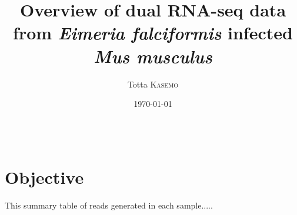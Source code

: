 \documentclass{article}
\title{Overview of dual RNA-seq data from \textit{Eimeria falciformis} infected \textit{Mus musculus}} %
\author{Totta \textsc{Kasemo}} %
\date{\today} %
\begin{document}
\maketitle %

\begin{center}
\begin{tabular}{l r}
\end{tabular}
\end{center}



\section{Objective}

This summary table of reads generated in each sample.....


\end{document}
